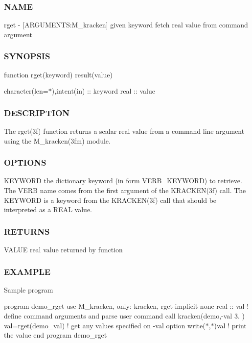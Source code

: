 \subsubsection*{N\+A\+ME}

rget -\/ \mbox{[}A\+R\+G\+U\+M\+E\+N\+TS\+:M\+\_\+kracken\mbox{]} given keyword fetch real value from command argument \subsubsection*{S\+Y\+N\+O\+P\+S\+IS}

function rget(keyword) result(value)

character(len=$\ast$),intent(in) \+:\+: keyword real \+:\+: value \subsubsection*{D\+E\+S\+C\+R\+I\+P\+T\+I\+ON}

The rget(3f) function returns a scalar real value from a command line argument using the M\+\_\+kracken(3fm) module. \subsubsection*{O\+P\+T\+I\+O\+NS}

K\+E\+Y\+W\+O\+RD the dictionary keyword (in form V\+E\+R\+B\+\_\+\+K\+E\+Y\+W\+O\+RD) to retrieve. The V\+E\+RB name comes from the first argument of the K\+R\+A\+C\+K\+E\+N(3f) call. The K\+E\+Y\+W\+O\+RD is a keyword from the K\+R\+A\+C\+K\+E\+N(3f) call that should be interpreted as a R\+E\+AL value. \subsubsection*{R\+E\+T\+U\+R\+NS}

V\+A\+L\+UE real value returned by function \subsubsection*{E\+X\+A\+M\+P\+LE}

Sample program

program demo\+\_\+rget use M\+\_\+kracken, only\+: kracken, rget implicit none real \+:\+: val ! define command arguments and parse user command call kracken(\textquotesingle{}demo\textquotesingle{},\textquotesingle{}-\/val 3.\textquotesingle{} ) val=rget(\textquotesingle{}demo\+\_\+val\textquotesingle{}) ! get any values specified on -\/val option write($\ast$,$\ast$)val ! print the value end program demo\+\_\+rget

